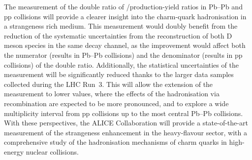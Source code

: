 The measurement of the double ratio of \ds/\dpl production-yield ratios in Pb--Pb and pp collisions will provide a clearer insight into the charm-quark hadronisation in a strangeness rich medium. This measurement would doubly benefit from the reduction of the systematic uncertainties from the reconstruction of both D meson species in the same decay channel, as the improvement would affect both the numerator (results in Pb--Pb collisions) and the denominator (results in pp collisions) of the double ratio. Additionally, the statistical uncertainties of the measurement will be significantly reduced thanks to the larger data samples collected during the LHC Run~3. This will allow the extension of the measurement to lower \pt values, where the effects of the hadronisation via recombination are expected to be more pronounced, and to explore a wide multiplicity interval from pp collisions up to the most central Pb--Pb collisions. With these perspectives, the ALICE Collaboration will provide a state-of-the-art measurement of the strangeness enhancement in the heavy-flavour sector, with a comprehensive study of the hadronisation mechanisms of charm quarks in high-energy nuclear collisions.



